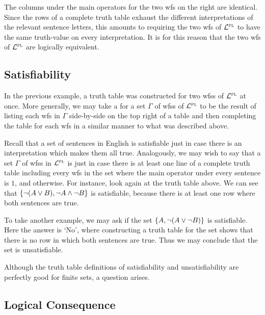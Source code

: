 The columns under the main operators for the two wfs on the right are identical.
Since the rows of a complete truth table exhaust the different interpretations of the relevant sentence letters, this amounts to requiring the two wfs of $\mathcal{L}^{\textsc{pl}}$ to have the same truth-value on every interpretation.
It is for this reason that the two wfs of $\mathcal{L}^{\textsc{pl}}$ are logically equivalent.





\subsection{Satisfiability}
\label{sub:PL-Satisfiability}

In the previous example, a truth table was constructed for two wfss of $\mathcal{L}^{\textsc{pl}}$ at once.
More generally, we may take a  for a set $\Gamma$ of wfss of $\mathcal{L}^{\textsc{pl}}$ to be the result of listing each wfs in $\Gamma$ side-by-side on the top right of a table and then completing the table for each wfs in a similar manner to what was described above.

Recall that a set of sentences in English is satisfiable just in case there is an interpretation which makes them all true.
Analogously, we may wish to say that a set $\Gamma$ of wfss in $\mathcal{L}^{\textsc{pl}}$ is  just in case there is at least one line of a complete truth table including every wfs in the set where the main operator under every sentence is $1$, and  otherwise.
For instance, look again at the truth table above.
We can see that $\lbrace\neg(A \vee B), \neg A \wedge \neg B\rbrace$ is satisfiable, because there is at least one row where both sentences are true.

To take another example, we may ask if the set $\lbrace A, \neg (A \vee \neg B)\rbrace$ is satisfiable.
Here the answer is `No', where constructing a truth table for the set shows that there is no row in which both sentences are true.
Thus we may conclude that the set is unsatisfiable.

Although the truth table definitions of satisfiability and unsatisfiability are perfectly good for finite sets, a question arises.



\subsection{Logical Consequence}
\label{sub:Consequence}

